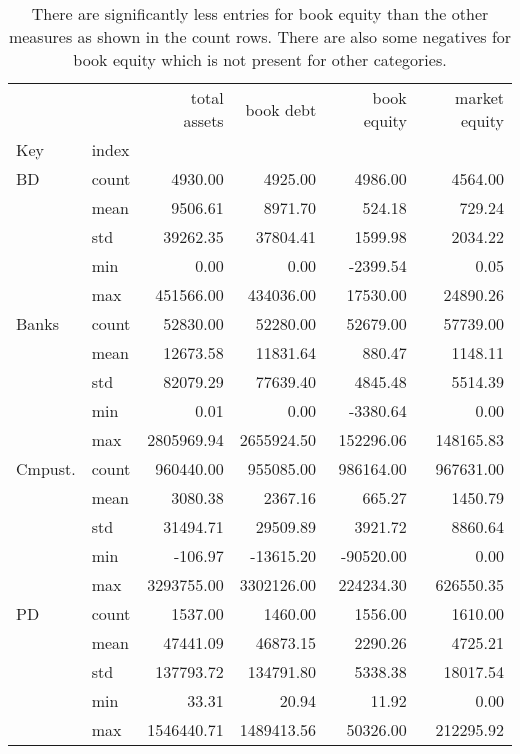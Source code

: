 \begin{table}
\caption{There are significantly less entries for book equity than the other measures as shown in the count rows. There are also some negatives for book equity which is not present for other categories. }
\label{tab:Table 2.1}
\begin{tabular}{llrrrr}
\toprule
 &  & total assets & book debt & book equity & market equity \\
Key & index &  &  &  &  \\
\midrule
{BD} & count & 4930.00 & 4925.00 & 4986.00 & 4564.00 \\
 & mean & 9506.61 & 8971.70 & 524.18 & 729.24 \\
 & std & 39262.35 & 37804.41 & 1599.98 & 2034.22 \\
 & min & 0.00 & 0.00 & -2399.54 & 0.05 \\
 & max & 451566.00 & 434036.00 & 17530.00 & 24890.26 \\
\cline{1-6}
{Banks} & count & 52830.00 & 52280.00 & 52679.00 & 57739.00 \\
 & mean & 12673.58 & 11831.64 & 880.47 & 1148.11 \\
 & std & 82079.29 & 77639.40 & 4845.48 & 5514.39 \\
 & min & 0.01 & 0.00 & -3380.64 & 0.00 \\
 & max & 2805969.94 & 2655924.50 & 152296.06 & 148165.83 \\
\cline{1-6}
{Cmpust.} & count & 960440.00 & 955085.00 & 986164.00 & 967631.00 \\
 & mean & 3080.38 & 2367.16 & 665.27 & 1450.79 \\
 & std & 31494.71 & 29509.89 & 3921.72 & 8860.64 \\
 & min & -106.97 & -13615.20 & -90520.00 & 0.00 \\
 & max & 3293755.00 & 3302126.00 & 224234.30 & 626550.35 \\
\cline{1-6}
{PD} & count & 1537.00 & 1460.00 & 1556.00 & 1610.00 \\
 & mean & 47441.09 & 46873.15 & 2290.26 & 4725.21 \\
 & std & 137793.72 & 134791.80 & 5338.38 & 18017.54 \\
 & min & 33.31 & 20.94 & 11.92 & 0.00 \\
 & max & 1546440.71 & 1489413.56 & 50326.00 & 212295.92 \\
\cline{1-6}
\bottomrule
\end{tabular}
\end{table}
